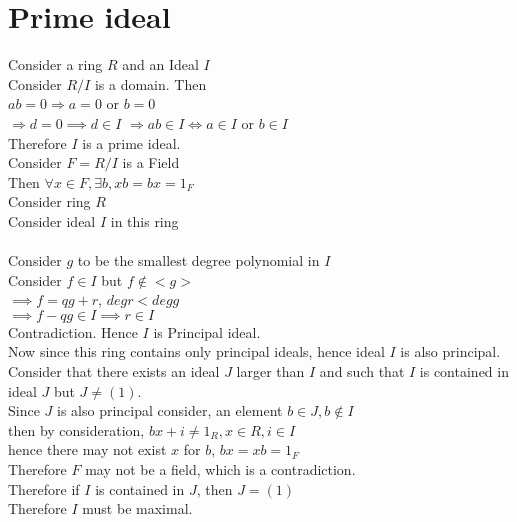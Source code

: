 \documentclass{article}
\begin{document}
\section{Prime ideal}
Consider a ring $R$ and an Ideal $I$ \\
Consider $R/I$ is a domain. Then \\
$ab = 0 \Rightarrow a = 0$ or $b = 0$ \\
$\Rightarrow d = 0 \implies d \in I$
$\Rightarrow ab \in I \Leftrightarrow a \in I$ or $b \in I$ \\
Therefore $I$ is a prime ideal. \\
Consider $F = R/I$ is a Field \\
Then $\forall x \in F, \exists b, xb = bx = 1_F$ 
\\ Consider ring $R$
\\ Consider ideal $I$ in this ring
\\ 
\\  Consider $g$ to be the smallest degree polynomial in $I$
\\ Consider $f \in I$ but $f \not \in <g>$
\\ $\implies f = qg+ r$, $degr < degg$
\\ $\implies f-qg \in I \implies r \in I$
\\ Contradiction. Hence $I$ is Principal ideal. \\
Now since this ring contains only principal ideals, hence ideal $I$ is also principal. 
Consider that there exists an ideal $J$ larger than $I$ and such that $I$ is contained in ideal $J$ but $J \neq (1).$ \\ 
Since $J$ is also principal consider, an element $b \in J , b \not \in I$ \\
then by consideration, $bx + i \neq 1_R, x \in R, i \in I$ \\
hence there may not exist $x$ for $b$, $bx = xb = 1_F$ \\
Therefore $F$ may not be a field, which is a contradiction. \\
Therefore if $I$ is contained in $J$, then $J = (1)$ \\
Therefore $I$ must be maximal.

\medskip
\printbibliography
\end{document}
